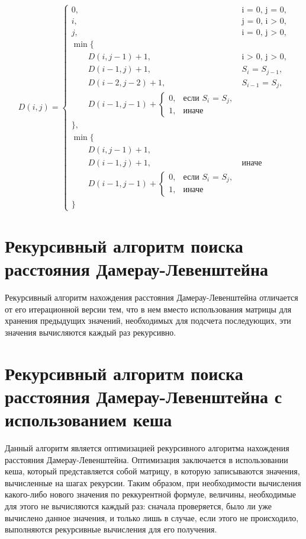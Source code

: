 \documentclass[a4paper,14pt, unknownkeysallowed]{extreport}
\begin{document}
\begin{equation}
	\label{eq:DL}
	D(i, j) = \begin{cases}
		
		0, &\text{i = 0, j = 0,}\\
		i, &\text{j = 0, i > 0,}\\
		j, &\text{i = 0, j > 0,}\\
		
		\min \lbrace \\
		\qquad D(i, j-1) + 1,&\text{i > 0, j > 0,}\\
		\qquad D(i-1, j) + 1,&\text{$S_{i}$ = $S_{j-1}$,}\\
		\qquad D(i-2, j-2) + 1,&\text{$S_{i-1}$ = $S_{j}$,}\\
		\qquad D(i-1, j-1) + \begin{cases}
                        		0, &\text{если $S_{i}$ = $S_{j}$,}\\
                        		1, &\text{иначе}
                        	\end{cases}\\
		\rbrace,\\
		
		\min \lbrace \\
		\qquad D(i, j-1) + 1,\\
		\qquad D(i-1, j) + 1,&\text{иначе}\\
		\qquad D(i-1, j-1) + \begin{cases}
                        		0, &\text{если $S_{i}$ = $S_{j}$,}\\
                        		1, &\text{иначе}
                        	\end{cases}\\
		\rbrace
	\end{cases}
\end{equation}
	
\section{Рекурсивный алгоритм поиска расстояния Дамерау-Левенштейна}
	
Рекурсивный алгоритм нахождения расстояния Дамерау-Левенштейна отличается от его итерационной версии тем, что в нем вместо использования матрицы для хранения предыдущих значений, необходимых для подсчета последующих, эти значения вычисляются каждый раз рекурсивно. 
	
\section{Рекурсивный алгоритм поиска расстояния Дамерау-Левенштейна с использованием кеша}
Данный алгоритм является оптимизацией рекурсивного алгоритма нахождения расстояния Дамерау-Левенштейна. 
Оптимизация заключается в использовании кеша, который представляется собой матрицу, в которую записываются значения, вычисленные на шагах рекурсии. 
Таким образом, при необходимости вычисления какого-либо нового значения по реккурентной формуле, величины, необходимые для этого не вычисляются каждый раз: сначала проверяется, было ли уже вычислено данное значения, и только лишь в случае, если этого не происходило, выполняются рекурсивные вычисления для его получения.
	
\end{document}

